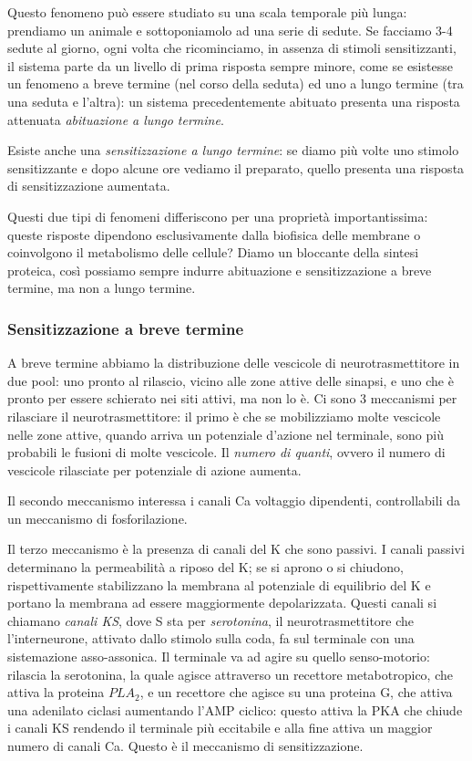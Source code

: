 \documentclass[a4paper,12pt]{article}
\begin{document}
Questo fenomeno può essere studiato su una scala temporale più lunga: prendiamo un animale e sottoponiamolo ad una serie di sedute. Se facciamo 3-4 sedute al giorno, ogni volta che ricominciamo, in assenza di stimoli sensitizzanti, il sistema parte da un livello di prima risposta sempre minore, come se esistesse un fenomeno a breve termine (nel corso della seduta) ed uno a lungo termine (tra una seduta e l'altra): un sistema precedentemente abituato presenta una risposta attenuata \emph{abituazione a lungo termine}.

Esiste anche una \emph{sensitizzazione a lungo termine}: se diamo più volte uno stimolo sensitizzante e dopo alcune ore vediamo il preparato, quello presenta una risposta di sensitizzazione aumentata.

Questi due tipi di fenomeni differiscono per una proprietà importantissima: queste risposte dipendono esclusivamente dalla biofisica delle membrane o coinvolgono il metabolismo delle cellule? Diamo un bloccante della sintesi proteica, così possiamo sempre indurre abituazione e sensitizzazione a breve termine, ma non a lungo termine.

\subsubsection{Sensitizzazione a breve termine}
A breve termine abbiamo la distribuzione delle vescicole di neurotrasmettitore in due pool: uno pronto al rilascio, vicino alle zone attive delle sinapsi, e uno che è pronto per essere schierato nei siti attivi, ma non lo è. 
Ci sono 3 meccanismi per rilasciare il neurotrasmettitore: il primo è che se mobilizziamo molte vescicole nelle zone attive, quando arriva un potenziale d'azione nel terminale, sono più probabili le fusioni di molte vescicole. Il \emph{numero di quanti}, ovvero il numero di vescicole rilasciate per potenziale di azione aumenta.

Il secondo meccanismo interessa i canali Ca voltaggio dipendenti, controllabili da un meccanismo di fosforilazione. 

Il terzo meccanismo è la presenza di canali del K che sono passivi. I canali passivi determinano la permeabilità a riposo del K; se si aprono o si chiudono, rispettivamente stabilizzano la membrana al potenziale di equilibrio del K e portano la membrana ad essere maggiormente depolarizzata. Questi canali si chiamano \emph{canali KS}, dove S sta per \emph{serotonina}, il neurotrasmettitore che l'interneurone, attivato dallo stimolo sulla coda, fa sul terminale con una sistemazione asso-assonica. Il terminale va ad agire su quello senso-motorio: rilascia la serotonina, la quale agisce attraverso un recettore metabotropico, che attiva la proteina $PLA_{2}$, e un recettore che agisce su una proteina G, che attiva una adenilato ciclasi aumentando l'AMP ciclico: questo attiva la PKA che chiude i canali KS rendendo il terminale più eccitabile e alla fine attiva un maggior numero di canali Ca. Questo è il meccanismo di sensitizzazione.
\end{document}

